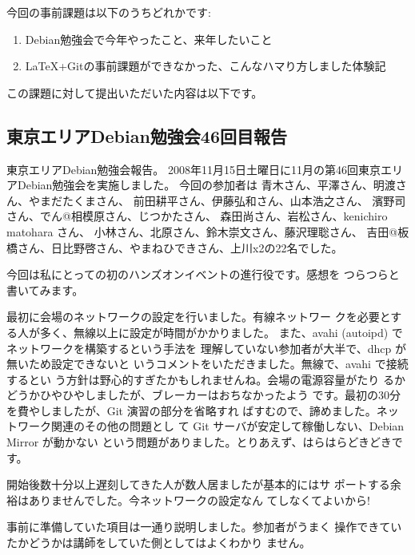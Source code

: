\documentclass[mingoth,a4paper]{jsarticle}
\begin{document}

今回の事前課題は以下のうちどれかです:

\begin{enumerate}
 \item Debian勉強会で今年やったこと、来年したいこと
 \item \LaTeX{}+Gitの事前課題ができなかった、こんなハマり方しました体験記
\end{enumerate}

この課題に対して提出いただいた内容は以下です。



\subsection{東京エリアDebian勉強会46回目報告}

東京エリアDebian勉強会報告。
2008年11月15日土曜日に11月の第46回東京エリアDebian勉強会を実施しました。
今回の参加者は
青木さん、平澤さん、明渡さん、やまだたくまさん、
前田耕平さん、伊藤弘和さん、山本浩之さん、
濱野司さん、でん@相模原さん、じつかたさん、
森田尚さん、岩松さん、kenichiro matohara さん、
小林さん、北原さん、鈴木崇文さん、藤沢理聡さん、
吉田@板橋さん、日比野啓さん、やまねひできさん、上川x2の22名でした。

今回は私にとっての初のハンズオンイベントの進行役です。感想を
つらつらと書いてみます。

最初に会場のネットワークの設定を行いました。有線ネットワー
クを必要とする人が多く、無線以上に設定が時間がかかりました。
また、avahi (autoipd) でネットワークを構築するという手法を
理解していない参加者が大半で、dhcp が無いため設定できないと
いうコメントをいただきました。無線で、avahi で接続するとい
う方針は野心的すぎたかもしれませんね。会場の電源容量がたり
るかどうかひやひやしましたが、ブレーカーはおちなかったよう
です。最初の30分を費やしましたが、Git 演習の部分を省略すれ
ばすむので、諦めました。ネットワーク関連のその他の問題とし
て Git サーバが安定して稼働しない、Debian Mirror が動かない
という問題がありました。とりあえず、はらはらどきどきです。


開始後数十分以上遅刻してきた人が数人居ましたが基本的にはサ
ポートする余裕はありませんでした。今ネットワークの設定なん
てしなくてよいから!


事前に準備していた項目は一通り説明しました。参加者がうまく
操作できていたかどうかは講師をしていた側としてはよくわかり
ません。
\end{document}
